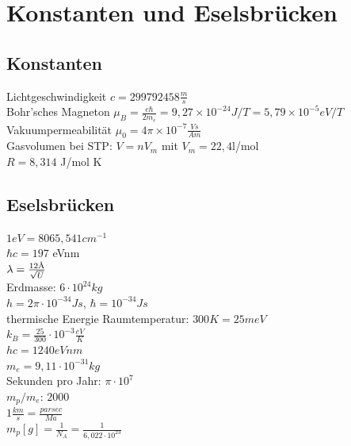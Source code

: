 \documentclass[12pt,a4paper, twoside]{article}
\renewcommand{\=}[1]{\stackrel{#1}{=}}
\theoremstyle{definition}
\theoremstyle{remark}
\begin{document}
%
%
%
%

\newpage
\section{Konstanten und Eselsbrücken}

\subsection{Konstanten}
Lichtgeschwindigkeit \dotfill $c = 299 792 458 \frac{m}{s}$\\
Bohr'sches Magneton \dotfill $\mu_B = \frac{e\hbar}{2m_e} = 9,27 \times 10^{-24} J/T = 5,79 \times 10^{-5} eV/T$\\
Vakuumpermeabilität \dotfill $\mu_0 = 4\pi \times 10^{-7} \frac{Vs}{Am}$\\
Gasvolumen bei STP: $V = n V_m$ mit $V_m = 22,4$l/mol\\
$R = 8,314$ J/mol K


\subsection{Eselsbrücken}

$1eV = 8065,541 cm^{-1}$\\
$\hbar c = 197$ eVnm\\
$\lambda = \frac{12{\text \AA}}{\sqrt{U}}$\\
Erdmasse: $6 \cdot 10^{24} kg$\\
$h = 2 \pi \cdot 10^{-34} Js$, $\hbar = 10^{-34} Js$\\
thermische Energie Raumtemperatur: $300K = 25meV$\\
$k_B = \frac{25}{300} \cdot 10^{-3} \frac{eV}{K}$\\
$hc = 1240 eVnm$\\
$m_e = 9,11 \cdot 10^{-31}kg$\\
Sekunden pro Jahr: $\pi \cdot 10^7$\\
$m_p / m_e$: $2000$\\
$1 \frac{km}{s}  = \frac{parsec}{Ma}$\\
$m_p[g] = \frac{1}{N_A} = \frac{1}{6,022 \cdot 10^{23}}$
\end{document}
